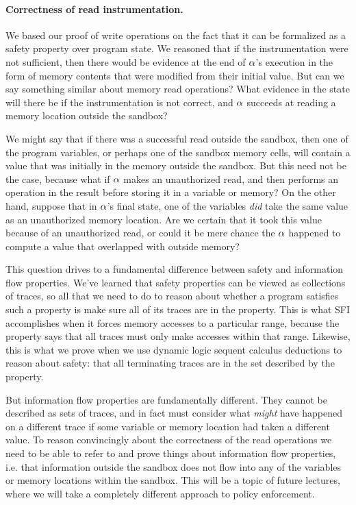 \documentclass[11pt,twoside]{scrartcl}
\begin{document}
\paragraph{Correctness of read instrumentation.}
We based our proof of write operations on the fact that it can be formalized as a safety property over program state. We reasoned that if the instrumentation were not sufficient, then there would be evidence at the end of $\alpha$'s execution in the form of memory contents that were modified from their initial value. But can we say something similar about memory read operations? What evidence in the state will there be if the instrumentation is not correct, and $\alpha$ succeeds at reading a memory location outside the sandbox?

We might say that if there was a successful read outside the sandbox, then one of the program variables, or perhaps one of the sandbox memory cells, will contain a value that was initially in the memory outside the sandbox. But this need not be the case, because what if $\alpha$ makes an unauthorized read, and then performs an operation in the result before storing it in a variable or memory? On the other hand, suppose that in $\alpha$'s final state, one of the variables \emph{did} take the same value as an unauthorized memory location. Are we certain that it took this value because of an unauthorized read, or could it be mere chance the $\alpha$ happened to compute a value that overlapped with outside memory?

This question drives to a fundamental difference between safety and information flow properties. We've learned that safety properties can be viewed as collections of traces, so all that we need to do to reason about whether a program satisfies such a property is make sure all of its traces are in the property. This is what SFI accomplishes when it forces memory accesses to a particular range, because the property says that all traces must only make accesses within that range. Likewise, this is what we prove when we use dynamic logic sequent calculus deductions to reason about safety: that all terminating traces are in the set described by the property.

But information flow properties are fundamentally different. They cannot be described as sets of traces, and in fact must consider what \emph{might} have happened on a different trace if some variable or memory location had taken a different value. To reason convincingly about the correctness of the read operations we need to be able to refer to and prove things about information flow properties, i.e. that information outside the sandbox does not flow into any of the variables or memory locations within the sandbox. This will be a topic of future lectures, where we will take a completely different approach to policy enforcement.
\end{document}
